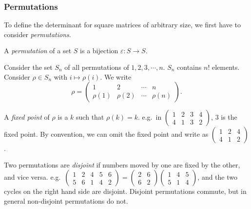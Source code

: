 \documentclass[a4paper]{article}
\begin{document}
\subsubsection{Permutations}
To define the determinant for square matrices of arbitrary size, we first have to consider \emph{permutations}.

\begin{defi}[Permutation]
  A \emph{permutation} of a set $S$ is a bijection $\varepsilon: S\to S$.
\end{defi}

\begin{notation}
  Consider the set $S_n$ of all permutations of $1, 2, 3, \cdots , n$. $S_n$ contains $n!$ elements. Consider $\rho\in S_n$ with $i \mapsto \rho(i)$. We write
  \[
    \rho = \begin{pmatrix} 1 & 2 & \cdots & n\\ \rho(1) & \rho (2) &\cdots & \rho (n)\end{pmatrix}.
  \]
\end{notation}

\begin{defi}
  A \emph{fixed point} of $\rho$ is a $k$ such that $\rho(k) = k$. e.g.\ in $\begin{pmatrix} 1 & 2 & 3 & 4\\4 & 1 & 3 & 2\end{pmatrix}$, $3$ is the fixed point. By convention, we can omit the fixed point and write as $\begin{pmatrix} 1 & 2 & 4\\ 4 & 1 & 2\end{pmatrix}$.
\end{defi}

\begin{defi}
  Two permutations are \emph{disjoint} if numbers moved by one are fixed by the other, and vice versa. e.g.\ $\begin{pmatrix} 1 & 2 & 4 & 5 & 6\\ 5 & 6 & 1 & 4 & 2\end{pmatrix} = \begin{pmatrix}2 & 6\\ 6& 2\end{pmatrix}\begin{pmatrix}1 & 4 & 5\\5 & 1 & 4\end{pmatrix}$, and the two cycles on the right hand side are disjoint. Disjoint permutations commute, but in general non-disjoint permutations do not.
\end{defi}
\end{document}
